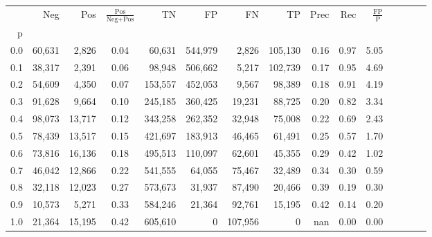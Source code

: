\begin{tabular}{rrrcrrrrrrrrrrr}
\toprule
{} &     Neg &     Pos & $\frac{\text{Pos}}{\text{Neg}+\text{Pos}}$ &       TN &       FP &       FN &       TP &  Prec &   Rec & $\frac{\text{FP}}{\text{P}}$ \\
p   &         &         &                                            &          &          &          &          &       &       &                              \\
\midrule
0.0 &  60,631 &   2,826 &                                       0.04 &   60,631 &  544,979 &    2,826 &  105,130 &  0.16 &  0.97 &                         5.05 \\
0.1 &  38,317 &   2,391 &                                       0.06 &   98,948 &  506,662 &    5,217 &  102,739 &  0.17 &  0.95 &                         4.69 \\
0.2 &  54,609 &   4,350 &                                       0.07 &  153,557 &  452,053 &    9,567 &   98,389 &  0.18 &  0.91 &                         4.19 \\
0.3 &  91,628 &   9,664 &                                       0.10 &  245,185 &  360,425 &   19,231 &   88,725 &  0.20 &  0.82 &                         3.34 \\
0.4 &  98,073 &  13,717 &                                       0.12 &  343,258 &  262,352 &   32,948 &   75,008 &  0.22 &  0.69 &                         2.43 \\
0.5 &  78,439 &  13,517 &                                       0.15 &  421,697 &  183,913 &   46,465 &   61,491 &  0.25 &  0.57 &                         1.70 \\
0.6 &  73,816 &  16,136 &                                       0.18 &  495,513 &  110,097 &   62,601 &   45,355 &  0.29 &  0.42 &                         1.02 \\
0.7 &  46,042 &  12,866 &                                       0.22 &  541,555 &   64,055 &   75,467 &   32,489 &  0.34 &  0.30 &                         0.59 \\
0.8 &  32,118 &  12,023 &                                       0.27 &  573,673 &   31,937 &   87,490 &   20,466 &  0.39 &  0.19 &                         0.30 \\
0.9 &  10,573 &   5,271 &                                       0.33 &  584,246 &   21,364 &   92,761 &   15,195 &  0.42 &  0.14 &                         0.20 \\
1.0 &  21,364 &  15,195 &                                       0.42 &  605,610 &        0 &  107,956 &        0 &   nan &  0.00 &                         0.00 \\
\bottomrule
\end{tabular}
